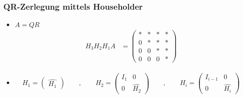 \setcounter{page}{4}
\begin{frame}
\frametitle{QR-Zerlegung mittels Householder}

\begin{itemize}
	\item $ A = QR $
		\begin{align*}
		H_3 H_2 H_1 A &= \left( 
		\begin{array}{cccc}
		* & * & * & * \\ 
		0 & * & * & * \\ 
		0 & 0 & * & * \\ 
		0 & 0 & 0 & *
		\end{array}
		\right)
		\end{align*} 

	\item
	\begin{align*}
	H_1 = \begin{pmatrix}
	\hat{H_1} 
	\end{pmatrix} \qquad , \qquad
	H_2 = \left(\begin{array}{l|l}
	I_{1} & 0\\ \hline
	0 & \hat{H_2} 	
	\end{array} \right)\qquad , \qquad
	H_i = \left(\begin{array}{l|l}
	I_{i-1} & 0\\ \hline
	0 & \hat{H_i} 	
	\end{array} \right)
	\end{align*}
\end{itemize}
\end{frame}




